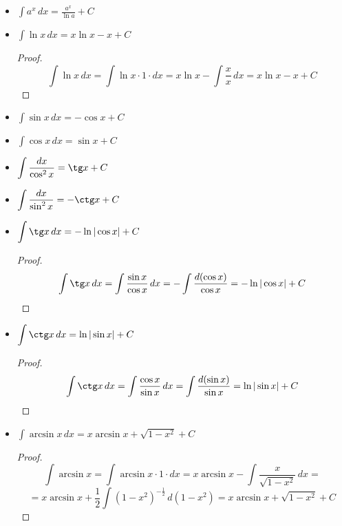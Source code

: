 \begin{itemize}
	\item $\displaystyle \int a^x\,dx = \frac{a^x}{\ln a} + C$
	
	\item $\displaystyle \int \ln x\,dx = x \ln x - x + C$
	\begin{proof}
	\begin{equation*}
	\int \ln x\,dx =
	\int \ln x \cdot 1 \cdot dx =
	x \ln x - \int \frac{x}x\,dx =
	x \ln x - x + C
	\end{equation*}
	\end{proof}
	
	\item $\displaystyle \int \sin x\,dx = -\cos x + C$
	
	\item $\displaystyle \int \cos x\,dx = \sin x + C$
	
	\item $\displaystyle \int \frac{dx}{\cos^2 x} = \tg x + C$
	
	\item $\displaystyle \int \frac{dx}{\sin^2 x} = -\ctg x + C$
	
	\item $\displaystyle \int \tg x\,dx = -\ln |\cos x| + C$
	\begin{proof}
	\begin{equation*}
	\int \tg x\,dx =
	\int \frac{\sin x}{\cos x}\,dx =
	-\int \frac{d(\cos x)}{\cos x} =
	-\ln |\cos x| + C
	\end{equation*}
	\end{proof}
	
	\item $\displaystyle \int \ctg x\,dx = \ln |\sin x| + C$
	\begin{proof}
	\begin{equation*}
	\int \ctg x\,dx =
	\int \frac{\cos x}{\sin x}\,dx =
	\int \frac{d(\sin x)}{\sin x} =
	\ln |\sin x| + C
	\end{equation*}
	\end{proof}
	
	\item $\displaystyle \int \arcsin x\,dx = x \arcsin x + \sqrt{1 - x^2} + C$
	\begin{proof}
	\begin{equation*}
	\int \arcsin x =
	\int \arcsin x \cdot 1 \cdot dx =
	x \arcsin x - \int \frac{x}{\sqrt{1 - x^2}}\,dx =
	\end{equation*}
	\begin{equation*}
	= x \arcsin x + \frac12 \int (1 - x^2)^{-\tfrac12}\,d(1 - x^2) =
	x \arcsin x + \sqrt{1 - x^2} + C
	\end{equation*}
	\end{proof}
	

\end{itemize}
